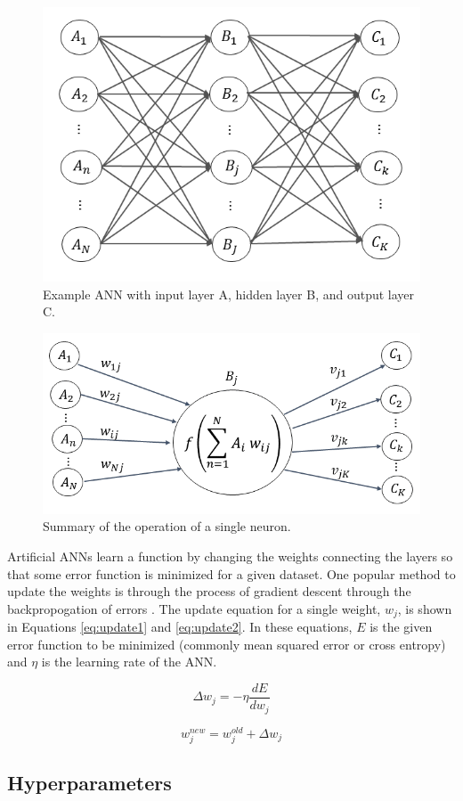 \documentclass[tocnosub,noragright,centerchapter,12pt,fullpage]{uiucecethesis09}
\begin{document}
\begin{figure}
    \centering
    \includegraphics[width=0.5\linewidth]{images/Network}
    \caption{Example ANN with input layer A, hidden layer B, and output layer C.}
    \label{fig:Network}
\end{figure}

\begin{figure}
	\centering
	\includegraphics[width=0.65\linewidth]{images/Node_ABC_2}
	\caption{Summary of the operation of a single neuron.}
	\label{fig:Node}
\end{figure}

Artificial ANNs learn a function by changing the weights connecting the layers so that some error function is minimized for a given dataset. One popular method to update the weights is through the process of gradient descent through the backpropogation of errors \cite{Rumelhart1986}. The update equation for a single weight, $w_j$, is shown in Equations \ref{eq:update1} and \ref{eq:update2}. In these equations, $E$ is the given error function to be minimized (commonly mean squared error or cross entropy) and $\eta$ is the learning rate of the ANN.


\begin{equation} \label{eq:update1}
\Delta w_{j} = - \eta \frac{dE}{dw_j}
\end{equation}

\begin{equation} \label{eq:update2}
w^{new}_{j} = w^{old}_{j} + \Delta w_{j}
\end{equation}

\subsection{Hyperparameters}
\end{document}
